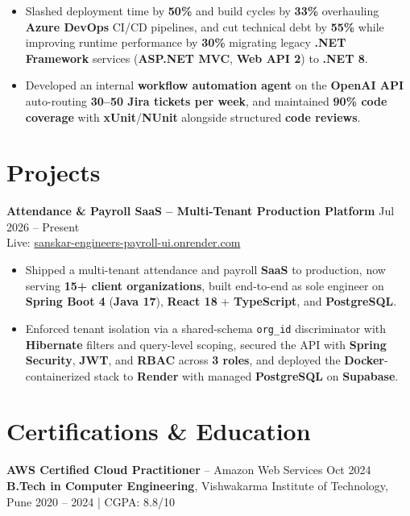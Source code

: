 \documentclass[a4paper,10pt]{article}
\begin{document}
\begin{itemize}[leftmargin=*]
    \item Slashed deployment time by \textbf{50\%} and build cycles by \textbf{33\%} overhauling \textbf{Azure DevOps} CI/CD pipelines, and cut technical debt by \textbf{55\%} while improving runtime performance by \textbf{30\%} migrating legacy \textbf{.NET Framework} services (\textbf{ASP.NET MVC}, \textbf{Web API 2}) to \textbf{.NET 8}.
    \item Developed an internal \textbf{workflow automation agent} on the \textbf{OpenAI API} auto-routing \textbf{30--50 Jira tickets per week}, and maintained \textbf{90\% code coverage} with \textbf{xUnit}/\textbf{NUnit} alongside structured \textbf{code reviews}.
\end{itemize}

\section*{Projects}

\textbf{Attendance \& Payroll SaaS -- Multi-Tenant Production Platform} \hfill Jul 2026 -- Present \\
Live: \href{https://sanskar-engineers-payroll-ui.onrender.com/login}{sanskar-engineers-payroll-ui.onrender.com}
\begin{itemize}[leftmargin=*]
    \item Shipped a multi-tenant attendance and payroll \textbf{SaaS} to production, now serving \textbf{15+ client organizations}, built end-to-end as sole engineer on \textbf{Spring Boot 4} (\textbf{Java 17}), \textbf{React 18} + \textbf{TypeScript}, and \textbf{PostgreSQL}.
    \item Enforced tenant isolation via a shared-schema \texttt{org\_id} discriminator with \textbf{Hibernate} filters and query-level scoping, secured the API with \textbf{Spring Security}, \textbf{JWT}, and \textbf{RBAC} across \textbf{3 roles}, and deployed the \textbf{Docker}-containerized stack to \textbf{Render} with managed \textbf{PostgreSQL} on \textbf{Supabase}.
\end{itemize}

\section*{Certifications \& Education}
\textbf{AWS Certified Cloud Practitioner} -- Amazon Web Services \hfill Oct 2024 \\
\textbf{B.Tech in Computer Engineering}, Vishwakarma Institute of Technology, Pune \hfill 2020 -- 2024 \;|\; CGPA: 8.8/10
\end{document}
